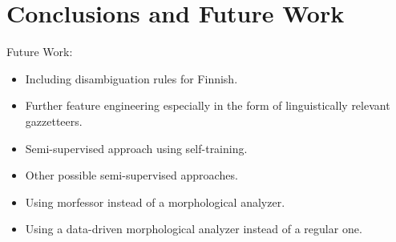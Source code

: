 \chapter{Conclusions and Future Work}

Future Work:
\begin{itemize}
\item Including disambiguation rules for Finnish.
\item Further feature engineering especially in the form of
  linguistically relevant gazzetteers.
\item Semi-supervised approach using self-training.
\item Other possible semi-supervised approaches.
\item Using morfessor instead of a morphological analyzer.
\item Using a data-driven morphological analyzer instead of a regular
  one.
\end{itemize}